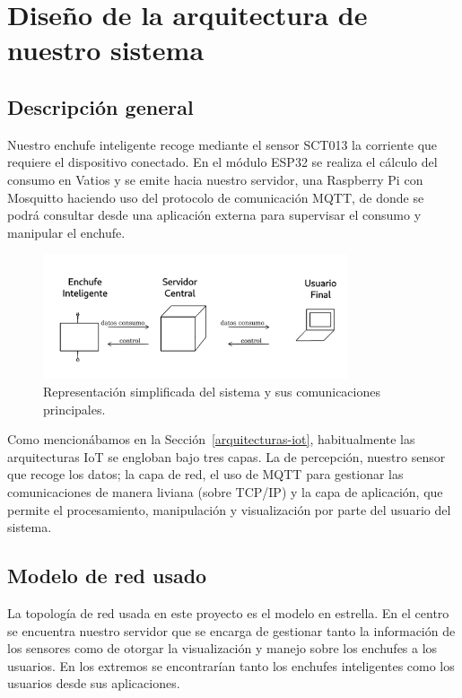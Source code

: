 \documentclass[a4paper,10pt]{article}
\begin{document}
\newpage

\section{Diseño de la arquitectura de nuestro
sistema}\label{diseno-arquitectura}

\subsection{Descripción general}\label{descripcion-general}

Nuestro enchufe inteligente recoge mediante el sensor SCT013 la
corriente que requiere el dispositivo conectado. En el módulo ESP32 se
realiza el cálculo del consumo en Vatios y se emite hacia nuestro
servidor, una Raspberry Pi con Mosquitto haciendo uso del protocolo de
comunicación MQTT, de donde se podrá consultar desde una aplicación
externa para supervisar el consumo y manipular el enchufe.

\begin{figure}[H]
  \centering
  \includegraphics[width=0.8\textwidth]{img/esquema_basico_sistema.png}
  \caption{Representación simplificada del sistema y sus comunicaciones
    principales.}\label{fig:esquema_basico}
\end{figure}


Como mencionábamos en la Sección~\ref{arquitecturas-iot},
habitualmente las arquitecturas IoT se engloban bajo tres capas. La de
percepción, nuestro sensor que recoge los datos; la capa de red, el
uso de MQTT para gestionar las comunicaciones de manera liviana (sobre
TCP/IP) y la capa de aplicación, que permite el procesamiento,
manipulación y visualización por parte del usuario del sistema.

\newpage

\subsection{Modelo de red usado}\label{modelo-de-red-usado}

La topología de red usada en este proyecto es el modelo en
estrella. En el centro se encuentra nuestro servidor que se encarga de
gestionar tanto la información de los sensores como de otorgar la
visualización y manejo sobre los enchufes a los usuarios. En los
extremos se encontrarían tanto los enchufes inteligentes como los
usuarios desde sus aplicaciones.
\end{document}
